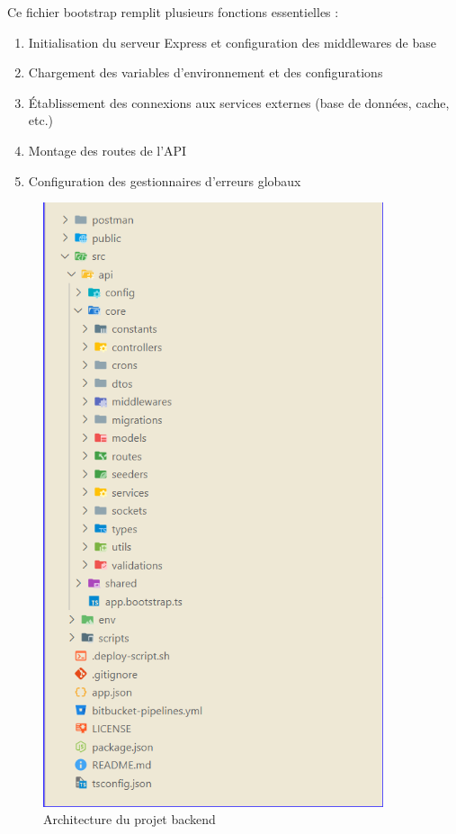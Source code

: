 \begin{enumerate}
\vspace{0.35cm}

Ce fichier bootstrap remplit plusieurs fonctions essentielles :

\begin{enumerate}
    \item Initialisation du serveur Express et configuration des middlewares de base
    \item Chargement des variables d'environnement et des configurations
    \item Établissement des connexions aux services externes (base de données, cache, etc.)
    \item Montage des routes de l'API
    \item Configuration des gestionnaires d'erreurs globaux
\end{enumerate}

\vspace{0.35cm}

\begin{figure}[H]
\begin{center}
\includegraphics[width=10cm]{assets/presentation/treewh.png}
\end{center}
\caption{Architecture du projet backend}
\end{figure}


\end{enumerate}
